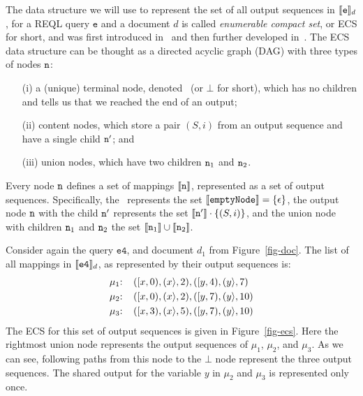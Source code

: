 The data structure we will use to represent the set of all output sequences in
$\llbracket\texttt{e}\rrbracket_d$, for a REQL query $\texttt{e}$ and a document $d$ is called
\emph{enumerable compact set}, or ECS for short, and was first introduced
in~\citet{AmarilliJMR22} and then further developed in~\citet{MunozR22}. The ECS
data structure can be thought as a directed acyclic graph (DAG) with three types
of nodes $\mathtt{n}$:
\begin{itemize}
	\item[(i)] a (unique) terminal node, denoted \cinit \ (or $\bot$ for short),
	which has no children and tells us that we reached the end of an output;
	\item[(ii)] content nodes, which store a pair $(S,i)$ from an output
	sequence and have a single child $\mathtt{n}'$; and
	\item[(iii)] union nodes, which have two children $\mathtt{n}_1$ and $\mathtt{n}_2$.
\end{itemize}
Every node $\mathtt{n}$ defines a set of mappings $\llbracket\mathtt{n}\rrbracket$, represented as a set
of output sequences. Specifically, the \cinit \ represents the set $\llbracket\texttt{emptyNode}\rrbracket
= \{\epsilon\}$, the output node $\mathtt{n}$ with the child $\mathtt{n}'$ represents the
set $\llbracket\mathtt{n}'\rrbracket \cdot \{(S,i)\}$, and the union node with children $\mathtt{n}_1$
and $\mathtt{n}_2$ the set $\llbracket\mathtt{n}_1\rrbracket \cup \llbracket\mathtt{n}_2\rrbracket$.


\begin{example}
Consider again the query $\texttt{e4}$, and document $d_1$ from
Figure~\ref{fig-doc}. The list of all mappings in $\llbracket\texttt{e4}\rrbracket_d$, as
represented by their output sequences is:
\begin{align*}
	\mu_1 & \text{: } \ \ (\Open{x},0),(\Close{x},2),(\Open{y},4),(\Close{y},7)  \\%
	\mu_2 & \text{: } \ \ (\Open{x},0),(\Close{x},2),(\Open{y},7),(\Close{y},10) \\ %
	\mu_3 & \text{: } \ \ (\Open{x},3),(\Close{x},5),(\Open{y},7),(\Close{y},10)
\end{align*}
The ECS for this set of output sequences is given in Figure~\ref{fig-ecs}. Here
the rightmost union node represents the output sequences of $\mu_1$, $\mu_2$,
and $\mu_3$. As we can see, following paths from this node to the $\bot$ node
represent the three output sequences. The shared output for the variable $y$ in
$\mu_2$ and $\mu_3$ is represented only once.
\end{example}

